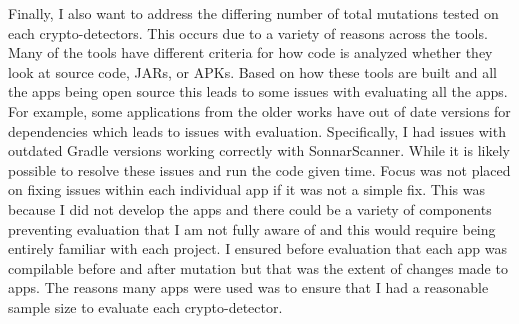 Finally, I also want to address the differing number of total mutations tested on each crypto-detectors. This occurs due to a variety of reasons across the tools. Many of the tools have different criteria for how code is analyzed whether they look at source code, JARs, or APKs. Based on how these tools are built and all the apps being open source this leads to some issues with evaluating all the apps. For example, some applications from the older works have out of date versions for dependencies which leads to issues with evaluation. Specifically, I had issues with outdated Gradle versions working correctly with SonnarScanner. While it is likely possible to resolve these issues and run the code given time. Focus was not placed on fixing issues within each individual app if it was not a simple fix. This was because I did not develop the apps and there could be a variety of components preventing evaluation that I am not fully aware of and this would require being entirely familiar with each project. I ensured before evaluation that each app was compilable before and after mutation but that was the extent of changes made to apps. The reasons many apps were used was to ensure that I had a reasonable sample size to evaluate each crypto-detector.